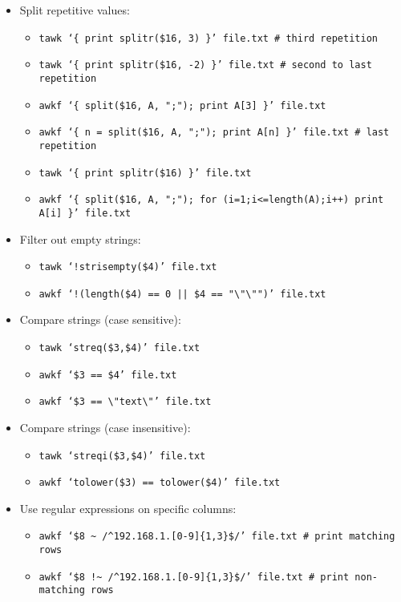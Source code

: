 \documentclass[documentation]{subfiles}
\begin{document}
\begin{itemize}
    \item Split repetitive values:
        \begin{itemize}
            \item {\tt tawk `\{ print splitr(\$16, 3) \}' file.txt \# third repetition}
            \item {\tt tawk `\{ print splitr(\$16, -2) \}' file.txt \# second to last repetition}
            \item {\tt awkf `\{ split(\$16, A, ";"); print A[3] \}' file.txt}
            \item {\tt awkf `\{ n = split(\$16, A, ";"); print A[n] \}' file.txt \# last repetition}
            \item {\tt tawk `\{ print splitr(\$16) \}' file.txt}
            \item {\tt awkf `\{ split(\$16, A, ";"); for (i=1;i<=length(A);i++) print A[i] \}' file.txt}
        \end{itemize}

    \item Filter out empty strings:
        \begin{itemize}
            \item {\tt tawk `!strisempty(\$4)' file.txt}
            \item {\tt awkf `!(length(\$4) == 0 || \$4 == "\textbackslash{}"\textbackslash{}"")' file.txt}
        \end{itemize}

    \item Compare strings (case sensitive):
        \begin{itemize}
            \item {\tt tawk `streq(\$3,\$4)' file.txt}
            \item {\tt awkf `\$3 == \$4' file.txt}
            \item {\tt awkf `\$3 == \textbackslash{}"text\textbackslash{}"' file.txt}
        \end{itemize}

    \item Compare strings (case insensitive):
        \begin{itemize}
            \item {\tt tawk `streqi(\$3,\$4)' file.txt}
            \item {\tt awkf `tolower(\$3) == tolower(\$4)' file.txt}
        \end{itemize}

    \item Use regular expressions on specific columns:
        \begin{itemize}
            \item {\tt awkf `\$8 \textasciitilde{} /\textasciicircum{}192.168.1.[0-9]\{1,3\}\$/' file.txt  \# print matching rows}
            \item {\tt awkf `\$8 !\textasciitilde{} /\textasciicircum{}192.168.1.[0-9]\{1,3\}\$/' file.txt \# print non-matching rows}
        \end{itemize}


\end{itemize}
\end{document}
